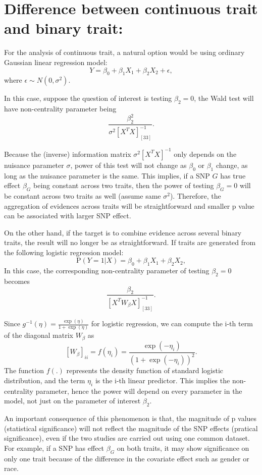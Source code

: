\documentclass[
]{article}
\begin{document}
\hypertarget{difference-between-continuous-trait-and-binary-trait}{%
\section{Difference between continuous trait and binary
trait:}\label{difference-between-continuous-trait-and-binary-trait}}

For the analysis of continuous trait, a natural option would be using
ordinary Gaussian linear regression model:
\[Y = \beta_0 + \beta_1 X_1 + \beta_2X_2+\epsilon,\] where
\(\epsilon \sim N(0,\sigma^2)\).

In this case, suppose the question of interest is testing \(\beta_2=0\),
the Wald test will have non-centrality parameter being
\[\frac{\beta_2^2}{\sigma^2[X^TX]^{-1}_{[33]}}.\]

Because the (inverse) information matrix \(\sigma^2[X^TX]^{-1}\) only
depends on the nuisance parameter \(\sigma\), power of this test will
not change as \(\beta_0\) or \(\beta_1\) change, as long as the nuisance
parameter is the same. This implies, if a SNP \(G\) has true effect
\(\beta_G\) being constant across two traits, then the power of testing
\(\beta_G = 0\) will be constant across two traits as well (assume same
\(\sigma^2\)). Therefore, the aggregation of evidences across traits
will be straightforward and smaller p value can be associated with
larger SNP effect.

On the other hand, if the target is to combine evidence across several
binary traits, the result will no longer be as straightforward. If
traits are generated from the following logistic regression model:
\[\text{P}(Y=1|X) = \beta_0 + \beta_1 X_1 + \beta_2X_2,\] In this case,
the corresponding non-centrality parameter of testing \(\beta_2=0\)
becomes \[\frac{\beta_2}{[X^TW_\beta X]^{-1}_{[33]}}.\]

Since \(g^{-1}(\eta)= \frac{\exp(\eta)}{1+\exp(\eta)}\) for logistic
regression, we can compute the i-th term of the diagonal matrix
\(W_\beta\) as
\[[W_\beta]_{ii} = f(\eta_i)=\frac{\exp(-\eta_i)}{(1+\exp(-\eta_i))^2}.\]
The function \(f(.)\) represents the density function of standard
logistic distribution, and the term \(\eta_i\) is the i-th linear
predictor. This implies the non-centrality parameter, hence the power
will depend on every parameter in the model, not just on the parameter
of interest \(\beta_2\).

An important consequence of this phenomenon is that, the magnitude of p
values (statistical significance) will not reflect the magnitude of the
SNP effects (pratical significance), even if the two studies are carried
out using one common dataset. For example, if a SNP has effect
\(\beta_G\) on both traits, it may show significance on only one trait
because of the difference in the covariate effect such as gender or
race.
\end{document}
